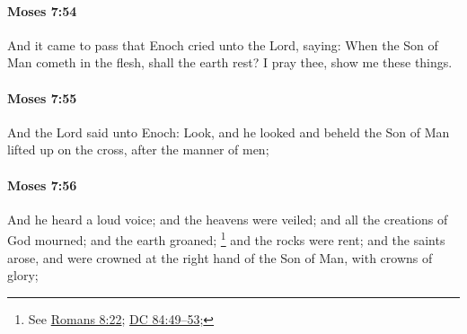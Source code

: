 		\paragraph{Moses 7:54} %
			\label{MOSES-7-54}

			And it came to pass that Enoch cried unto the Lord, saying: When the Son of Man cometh in the flesh, shall the earth rest? I pray thee, show me these things.


		\paragraph{Moses 7:55} %
			\label{MOSES-7-55}

			And the Lord said unto Enoch: Look, and he looked and beheld the Son of Man lifted up on the cross, after the manner of men;


		\paragraph{Moses 7:56} %
			\label{MOSES-7-56}

			And he heard a loud voice; and the heavens were veiled; and all the creations of God mourned; and the earth groaned;%
				\footnote{%
					See \hyperref[ROMANS-8-22]{Romans 8:22}; \hyperref[DC84-49]{DC 84:49--53}; 
					}
			and the rocks were rent; and the saints arose, and were crowned at the right hand of the Son of Man, with crowns of glory;

